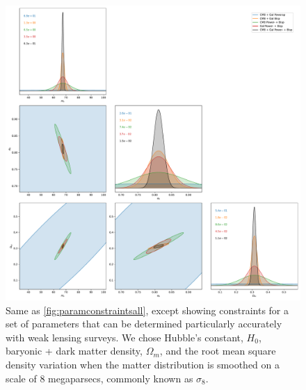 \documentclass[11pt]{article} %
\begin{document}

\begin{figure}
    \centering
    \includegraphics[width=\textwidth]{figures/param_constraints_tight.pdf}
    \caption{Same as \ref{fig:paramconstraintsall}, except showing constraints for a set of parameters that can be determined particularly accurately with weak lensing surveys. We chose Hubble's constant, $H_0$, baryonic + dark matter density, $\Omega_m$, and the root mean square density variation when the matter distribution is smoothed on a scale of 8 megaparsecs, commonly known as $\sigma_8$.}
    \label{fig:paramconstraintstight}
\end{figure}
\end{document}
